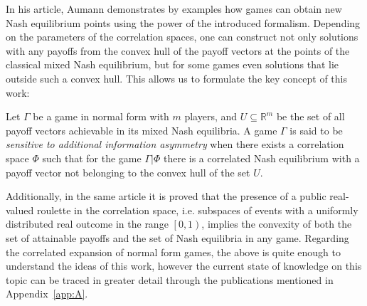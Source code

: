 In his article, Aumann demonstrates by examples how games can obtain new Nash equilibrium points using the power of the introduced formalism. Depending on the parameters of the correlation spaces, one can construct not only solutions with any payoffs from the convex hull of the payoff vectors at the points of the classical mixed Nash equilibrium, but for some games even solutions that lie outside such a convex hull. This allows us to formulate the key concept of this work: %
\begin{definition}
	Let $\Gamma$ be a game in normal form with $m$ players, and $U \subseteq \mathbb{R}^m$ be the set of all payoff vectors achievable in its mixed Nash equilibria. A game $\Gamma$ is said to be \emph{sensitive to additional information asymmetry} when there exists a correlation space $\Phi$ such that for the game $\Gamma | \Phi$ there is a correlated Nash equilibrium with a payoff vector not belonging to the convex hull of the set $U$. %
\end{definition}

Additionally, in the same article it is proved that the presence of a public real-valued roulette in the correlation space, i.e. subspaces of events with a uniformly distributed real outcome in the range $\left[0, 1\right)$, implies the convexity of both the set of attainable payoffs and the set of Nash equilibria in any game. Regarding the correlated expansion of normal form games, the above is quite enough to understand the ideas of this work, however the current state of knowledge on this topic can be traced in greater detail through the publications mentioned in Appendix~\cref{app:A}. %

